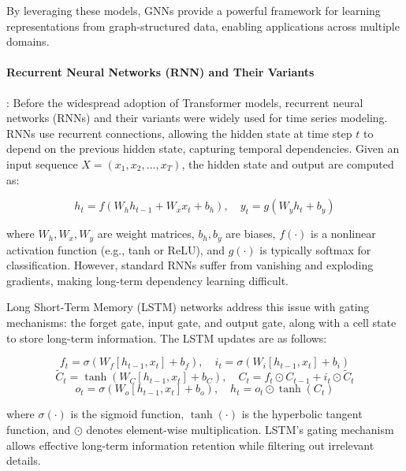 \documentclass[acmsmall]{acmart}
\begin{document}
By leveraging these models, GNNs provide a powerful framework for learning representations from graph-structured data, enabling applications across multiple domains.

\paragraph{Recurrent Neural Networks (RNN) and Their Variants}: Before the widespread adoption of Transformer models, recurrent neural networks (RNNs)\cite{rumelhart1986rnn} and their variants were widely used for time series modeling. RNNs use recurrent connections, allowing the hidden state at time step $t$ to depend on the previous hidden state, capturing temporal dependencies. Given an input sequence $X = (x_1, x_2, ..., x_T)$, the hidden state and output are computed as:

\begin{equation}
h_t = f(W_h h_{t-1} + W_x x_t + b_h), \quad y_t = g(W_y h_t + b_y)
\end{equation}

where $W_h, W_x, W_y$ are weight matrices, $b_h, b_y$ are biases, $f(\cdot)$ is a nonlinear activation function (e.g., tanh or ReLU), and $g(\cdot)$ is typically softmax for classification. However, standard RNNs suffer from vanishing and exploding gradients, making long-term dependency learning difficult.

Long Short-Term Memory (LSTM)\cite{rnn_lstm} networks address this issue with gating mechanisms: the forget gate, input gate, and output gate, along with a cell state to store long-term information. The LSTM updates are as follows:

\begin{equation}
f_t = \sigma(W_f [h_{t-1}, x_t] + b_f), \quad i_t = \sigma(W_i [h_{t-1}, x_t] + b_i)
\end{equation}
\begin{equation}
\tilde{C}_t = \tanh(W_C [h_{t-1}, x_t] + b_C), \quad C_t = f_t \odot C_{t-1} + i_t \odot \tilde{C}_t
\end{equation}
\begin{equation}
o_t = \sigma(W_o [h_{t-1}, x_t] + b_o), \quad h_t = o_t \odot \tanh(C_t)
\end{equation}

where $\sigma(\cdot)$ is the sigmoid function, $\tanh(\cdot)$ is the hyperbolic tangent function, and $\odot$ denotes element-wise multiplication. LSTM’s gating mechanism allows effective long-term information retention while filtering out irrelevant details. 
\end{document}
